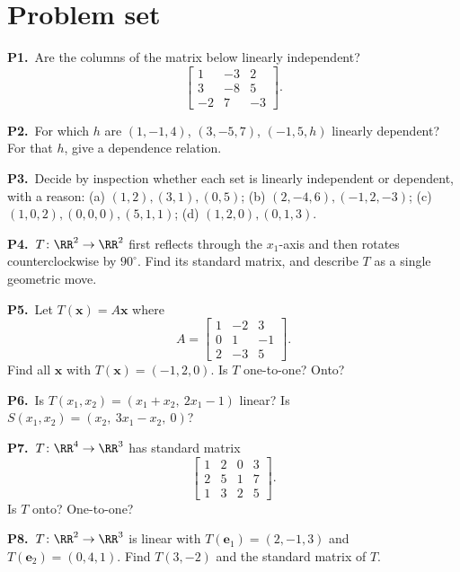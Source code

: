 \documentclass[10pt]{scrartcl}
\newcommand{\vv}[1]{\mathbf{#1}}
\begin{document}
\section{Problem set}
\begin{prob}\textbf{P1.}\ Are the columns of the matrix below linearly independent?
\[
  \begin{bmatrix} 1 & -3 & 2 \\ 3 & -8 & 5 \\ -2 & 7 & -3 \end{bmatrix}.
\]
\end{prob}
\begin{prob}\textbf{P2.}\ For which $h$ are $(1,-1,4)$, $(3,-5,7)$, $(-1,5,h)$ linearly dependent? For that $h$, give a dependence relation.
\end{prob}
\begin{prob}\textbf{P3.}\ Decide by inspection whether each set is linearly independent or dependent, with a reason: (a) $(1,2),(3,1),(0,5)$; (b) $(2,-4,6),(-1,2,-3)$; (c) $(1,0,2),(0,0,0),(5,1,1)$; (d) $(1,2,0),(0,1,3)$.
\end{prob}
\begin{prob}\textbf{P4.}\ $T\colon\RR^2\to\RR^2$ first reflects through the $x_1$-axis and then rotates counterclockwise by $90^\circ$. Find its standard matrix, and describe $T$ as a single geometric move.
\end{prob}
\begin{prob}\textbf{P5.}\ Let $T(\vv x)=A\vv x$ where
\[
  A = \begin{bmatrix} 1 & -2 & 3 \\ 0 & 1 & -1 \\ 2 & -3 & 5 \end{bmatrix}.
\]
Find all $\vv x$ with $T(\vv x)=(-1,2,0)$. Is $T$ one-to-one? Onto?
\end{prob}
\begin{prob}\textbf{P6.}\ Is $T(x_1,x_2)=(x_1+x_2,\ 2x_1-1)$ linear? Is $S(x_1,x_2)=(x_2,\ 3x_1-x_2,\ 0)$?
\end{prob}
\begin{prob}\textbf{P7.}\ $T\colon\RR^4\to\RR^3$ has standard matrix
\[
  \begin{bmatrix} 1 & 2 & 0 & 3 \\ 2 & 5 & 1 & 7 \\ 1 & 3 & 2 & 5 \end{bmatrix}.
\]
Is $T$ onto? One-to-one?
\end{prob}
\begin{prob}\textbf{P8.}\ $T\colon\RR^2\to\RR^3$ is linear with $T(\vv e_1)=(2,-1,3)$ and $T(\vv e_2)=(0,4,1)$. Find $T(3,-2)$ and the standard matrix of $T$.
\end{prob}
\end{document}
